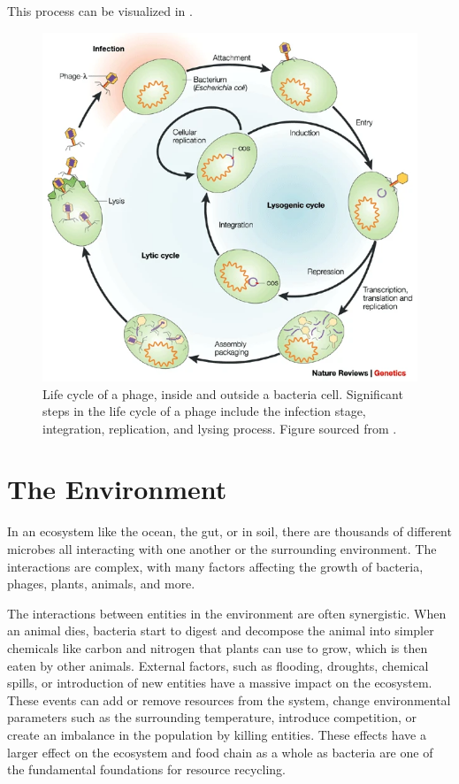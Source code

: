 This process can be visualized in .
\begin{figure}
    \centering
    \includegraphics[width=0.5\linewidth]{Figures/phage_life_cycle.png}
    \caption{Life cycle of a phage, inside and outside a bacteria cell. Significant steps in the life cycle of a phage include the infection stage, integration, replication, and lysing process. Figure sourced from \citet{campbellFutureBacteriophageBiology2003}. }
    \label{fig:phage_life_cycle}
\end{figure}

\section{The Environment}
In an ecosystem like the ocean, the gut, or in soil, there are thousands of different microbes all interacting with one another or the surrounding environment.
The interactions are complex, with many factors affecting the growth of bacteria, phages, plants, animals, and more. 

The interactions between entities in the environment are often synergistic. 
When an animal dies, bacteria start to digest and decompose the animal into simpler chemicals like carbon and nitrogen that plants can use to grow, which is then eaten by other animals. 
External factors, such as flooding, droughts, chemical spills, or introduction of new entities have a massive impact on the ecosystem. 
These events can add or remove resources from the system, change environmental parameters such as the surrounding temperature, introduce competition, or create an imbalance in the population by killing entities. 
These effects have a larger effect on the ecosystem and food chain as a whole as bacteria are one of the fundamental foundations for resource recycling. 


